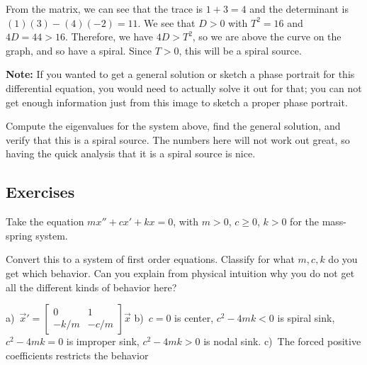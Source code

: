 \begin{exampleSol}
From the matrix, we can see that the trace is $1 + 3  = 4$ and the determinant is $(1)(3) - (4)(-2) = 11$. We see that $D > 0$ with $T^2 = 16$ and $4D = 44 > 16$. Therefore, we have $4D > T^2$, so we are above the curve on the graph, and so have a spiral. Since $T > 0$, this will be a spiral source. 

\textbf{Note:} If you wanted to get a general solution or sketch a phase portrait for this differential equation, you would need to actually solve it out for that; you can not get enough information just from this image to sketch a proper phase portrait.
\end{exampleSol}

\begin{exercise}
Compute the eigenvalues for the system above, find the general solution, and verify that this is a spiral source. The numbers here will not work out great, so having the quick analysis that it is a spiral source is nice. 
\end{exercise} 
 

\subsection{Exercises}

\begin{exercise}
Take the equation $m x'' + c x' + kx = 0$, with $m > 0$, $c \geq 0$, $k > 0$
for the mass-spring system.
\begin{tasks}
\task Convert this to a system of first
order equations.
\task Classify for what $m, c, k$ do you get which behavior.
\task Can you explain from physical intuition why you do not get all the
different kinds of behavior here?
\end{tasks}
\end{exercise}
\comboSol{%
}
{%
a)~${\vec{x}}' = \left[\begin{smallmatrix} 0 & 1 \\ -k/m &-c/m \end{smallmatrix}\right]\vec{x}$ \quad b)~$c=0$ is center, $c^2 - 4mk < 0$ is spiral sink, $c^2 - 4mk = 0$ is improper sink, $c^2 - 4mk > 0$ is nodal sink. \quad c)~The forced positive coefficients restricts the behavior 
}

